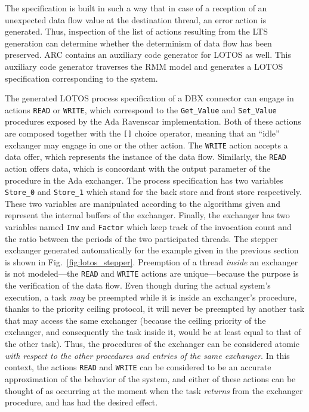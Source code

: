 The specification is built in such a way that in case of a reception
of an unexpected data flow value at the destination thread, an error
action is generated. Thus, inspection of the list of actions resulting
from the LTS generation can determine whether the determinism of data
flow has been preserved. ARC contains an auxiliary code generator for
LOTOS as well. This auxiliary code generator traverses the RMM model
and generates a LOTOS specification corresponding to the system.

The generated LOTOS process specification of a DBX connector can
engage in actions \texttt{READ} or \texttt{WRITE}, which correspond to
the \texttt{Get\_Value} and \texttt{Set\_Value} procedures exposed by
the Ada Ravenscar implementation. Both of these actions are composed
together with the \texttt{[]} choice operator, meaning that an
``idle'' exchanger may engage in one or the other action. The
\texttt{WRITE} action accepts a data offer, which represents the
instance of the data flow. Similarly, the \texttt{READ} action offers
data, which is concordant with the output parameter of the procedure
in the Ada exchanger. The process specification has two variables
\texttt{Store\_0} and \texttt{Store\_1} which stand for the back store
and front store respectively. These two variables are manipulated
according to the algorithms given and represent the internal buffers
of the exchanger. Finally, the exchanger has two variables named
\texttt{Inv} and \texttt{Factor} which keep track of the invocation
count and the ratio between the periods of the two participated
threads. The stepper exchanger generated automatically for the example
given in the previous section is shown in
Fig.~\ref{fig:lotos_stepper}. Preemption of a thread
\emph{inside} an exchanger is not modeled---the \texttt{READ} and
\texttt{WRITE} actions are unique---because the purpose is the
verification of the data flow. Even though during the actual system's
execution, a task \emph{may} be preempted while it is inside an
exchanger's procedure, thanks to the priority ceiling protocol, it
will never be preempted by another task that may access the same
exchanger (because the ceiling priority of the exchanger, and
consequently the task inside it, would be at least equal to that of
the other task). Thus, the procedures of the exchanger can be
considered atomic \emph{with respect to the other procedures and
  entries of the same exchanger}. In this context, the actions
\texttt{READ} and \texttt{WRITE} can be considered to be an accurate
approximation of the behavior of the system, and either of these
actions can be thought of as occurring at the moment when the task
\emph{returns} from the exchanger procedure, and has had the desired
effect.

